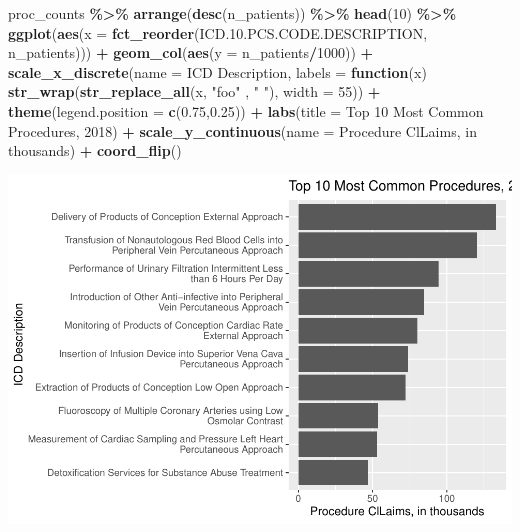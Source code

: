 \documentclass[preprint, 3p,
authoryear]{elsarticle} %
\newenvironment{Shaded}{\begin{snugshade}}{\end{snugshade}}
\newcommand{\ControlFlowTok}[1]{\textcolor[rgb]{0.13,0.29,0.53}{\textbf{#1}}}
\newcommand{\DataTypeTok}[1]{\textcolor[rgb]{0.13,0.29,0.53}{#1}}
\newcommand{\DecValTok}[1]{\textcolor[rgb]{0.00,0.00,0.81}{#1}}
\newcommand{\FloatTok}[1]{\textcolor[rgb]{0.00,0.00,0.81}{#1}}
\newcommand{\KeywordTok}[1]{\textcolor[rgb]{0.13,0.29,0.53}{\textbf{#1}}}
\newcommand{\NormalTok}[1]{#1}
\newcommand{\OperatorTok}[1]{\textcolor[rgb]{0.81,0.36,0.00}{\textbf{#1}}}
\newcommand{\StringTok}[1]{\textcolor[rgb]{0.31,0.60,0.02}{#1}}
\begin{document}
\begin{Shaded}
\begin{Highlighting}[]
\NormalTok{proc\_counts }\OperatorTok{\%\textgreater{}\%}
\StringTok{  }\KeywordTok{arrange}\NormalTok{(}\KeywordTok{desc}\NormalTok{(n\_patients)) }\OperatorTok{\%\textgreater{}\%}
\StringTok{  }\KeywordTok{head}\NormalTok{(}\DecValTok{10}\NormalTok{) }\OperatorTok{\%\textgreater{}\%}
\StringTok{  }\KeywordTok{ggplot}\NormalTok{(}\KeywordTok{aes}\NormalTok{(}\DataTypeTok{x =} \KeywordTok{fct\_reorder}\NormalTok{(ICD.}\FloatTok{10.}\NormalTok{PCS.CODE.DESCRIPTION, n\_patients))) }\OperatorTok{+}
\StringTok{  }\KeywordTok{geom\_col}\NormalTok{(}\KeywordTok{aes}\NormalTok{(}\DataTypeTok{y =}\NormalTok{ n\_patients}\OperatorTok{/}\DecValTok{1000}\NormalTok{)) }\OperatorTok{+}\StringTok{ }
\StringTok{  }\KeywordTok{scale\_x\_discrete}\NormalTok{(}\DataTypeTok{name =} \StringTok{\textquotesingle{}ICD Description\textquotesingle{}}\NormalTok{, }\DataTypeTok{labels =} \ControlFlowTok{function}\NormalTok{(x) }\KeywordTok{str\_wrap}\NormalTok{(}\KeywordTok{str\_replace\_all}\NormalTok{(x, }\StringTok{"foo"}\NormalTok{ , }\StringTok{" "}\NormalTok{), }\DataTypeTok{width =} \DecValTok{55}\NormalTok{)) }\OperatorTok{+}
\StringTok{  }\KeywordTok{theme}\NormalTok{(}\DataTypeTok{legend.position =} \KeywordTok{c}\NormalTok{(}\FloatTok{0.75}\NormalTok{,}\FloatTok{0.25}\NormalTok{)) }\OperatorTok{+}
\StringTok{  }\KeywordTok{labs}\NormalTok{(}\DataTypeTok{title =} \StringTok{\textquotesingle{}Top 10 Most Common Procedures, 2018\textquotesingle{}}\NormalTok{) }\OperatorTok{+}
\StringTok{  }\KeywordTok{scale\_y\_continuous}\NormalTok{(}\DataTypeTok{name =} \StringTok{\textquotesingle{}Procedure ClLaims, in thousands\textquotesingle{}}\NormalTok{) }\OperatorTok{+}
\StringTok{  }\KeywordTok{coord\_flip}\NormalTok{() }
\end{Highlighting}
\end{Shaded}

\includegraphics{final-project-paper_files/figure-latex/top-10-procedures-1.pdf}


\end{document}
